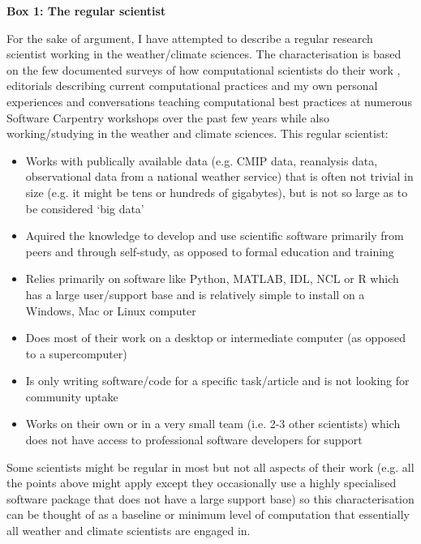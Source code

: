 \textbf{Box 1: The regular scientist}

For the sake of argument, I have attempted to describe a regular research scientist working in the weather/climate sciences. The characterisation is based on the few documented surveys of how computational scientists do their work \citep{Hannay2009,Stodden2010}, editorials describing current computational practices \citep[e.g.][]{Easterbrook2014} and my own personal experiences and conversations teaching computational best practices at numerous Software Carpentry workshops over the past few years while also working/studying in the weather and climate sciences. This regular scientist:
\begin{itemize}
\item Works with publically available data (e.g. CMIP data, reanalysis data, observational data from a national weather service) that is often not trivial in size (e.g. it might be tens or hundreds of gigabytes), but is not so large as to be considered `big data' 
\item Aquired the knowledge to develop and use scientific software primarily from peers and through self-study, as opposed to formal education and training
\item Relies primarily on software like Python, MATLAB, IDL, NCL or R which has a large user/support base and is relatively simple to install on a Windows, Mac or Linux computer
\item Does most of their work on a desktop or intermediate computer (as opposed to a supercomputer)
\item Is only writing software/code for a specific task/article and is not looking for community uptake  
\item Works on their own or in a very small team (i.e. 2-3 other scientists) which does not have access to professional software developers for support
\end{itemize}

Some scientists might be regular in most but not all aspects of their work (e.g. all the points above might apply except they occasionally use a highly specialised software package that does not have a large support base) so this characterisation can be thought of as a baseline or minimum level of computation that essentially all weather and climate scientists are engaged in.  








